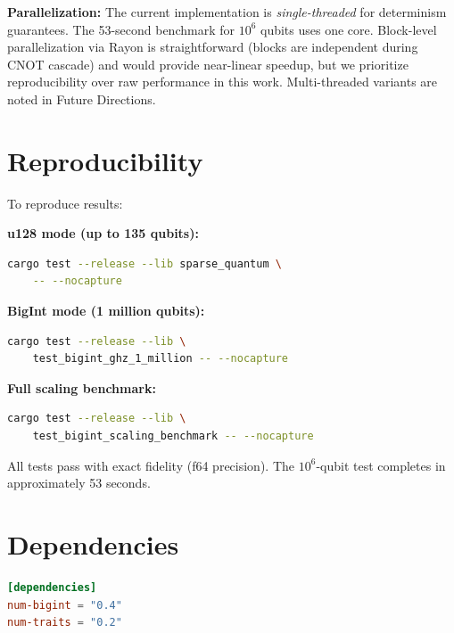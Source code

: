 \documentclass[11pt,twocolumn]{article}
\begin{document}
\textbf{Parallelization:} The current implementation is \emph{single-threaded} for determinism guarantees. The 53-second benchmark for $10^6$ qubits uses one core. Block-level parallelization via Rayon is straightforward (blocks are independent during CNOT cascade) and would provide near-linear speedup, but we prioritize reproducibility over raw performance in this work. Multi-threaded variants are noted in Future Directions.

\section{Reproducibility}

To reproduce results:

\textbf{u128 mode (up to 135 qubits):}
\begin{lstlisting}[language=bash]
cargo test --release --lib sparse_quantum \
    -- --nocapture
\end{lstlisting}

\textbf{BigInt mode (1 million qubits):}
\begin{lstlisting}[language=bash]
cargo test --release --lib \
    test_bigint_ghz_1_million -- --nocapture
\end{lstlisting}

\textbf{Full scaling benchmark:}
\begin{lstlisting}[language=bash]
cargo test --release --lib \
    test_bigint_scaling_benchmark -- --nocapture
\end{lstlisting}

All tests pass with exact fidelity (f64 precision). The $10^6$-qubit test completes in approximately 53 seconds.

\section{Dependencies}

\begin{lstlisting}[language=TOML,caption={Cargo.toml additions for BigInt}]
[dependencies]
num-bigint = "0.4"
num-traits = "0.2"
\end{lstlisting}
\end{document}
